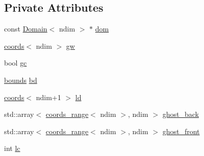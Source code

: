 \subsection*{Private Attributes}
\begin{DoxyCompactItemize}
\item 
const \hyperlink{classshark_1_1ndim_1_1_domain}{Domain}$<$ ndim $>$ $\ast$ \hyperlink{classshark_1_1ndim_1_1_global_array_a412e192f4c7a15888da625ae833e8d3e}{dom}
\item 
\hyperlink{structshark_1_1ndim_1_1coords}{coords}$<$ ndim $>$ \hyperlink{classshark_1_1ndim_1_1_global_array_a38d93d114d585e5e5491c5ecd35c6bfc}{gw}
\item 
bool \hyperlink{classshark_1_1ndim_1_1_global_array_a100f4d523420deffde330079df7501e2}{gc}
\item 
\hyperlink{classshark_1_1ndim_1_1_global_array_a5376df376a8de6a0a756def884c55864}{bounds} \hyperlink{classshark_1_1ndim_1_1_global_array_aead89700a3d1d960432c6dc971251a9c}{bd}
\item 
\hyperlink{structshark_1_1ndim_1_1coords}{coords}$<$ ndim+1 $>$ \hyperlink{classshark_1_1ndim_1_1_global_array_afdc4665e0fde4a703785436af351df49}{ld}
\item 
std\+::array$<$ \hyperlink{structshark_1_1ndim_1_1coords__range}{coords\+\_\+range}$<$ ndim $>$, ndim $>$ \hyperlink{classshark_1_1ndim_1_1_global_array_a97eb47a8cd80d98627706e673259a310}{ghost\+\_\+back}
\item 
std\+::array$<$ \hyperlink{structshark_1_1ndim_1_1coords__range}{coords\+\_\+range}$<$ ndim $>$, ndim $>$ \hyperlink{classshark_1_1ndim_1_1_global_array_a48ce861293f294f003ef16ebd49eb942}{ghost\+\_\+front}
\item 
int \hyperlink{classshark_1_1ndim_1_1_global_array_a8248f4bd6e1f48d25148dd6d5288cb4c}{lc}
\end{DoxyCompactItemize}
